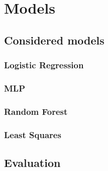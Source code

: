\section{Models}
\subsection{Considered models}
\subsubsection{Logistic Regression}
\subsubsection{MLP}
\subsubsection{Random Forest}
\subsubsection{Least Squares}
\subsection{Evaluation}
